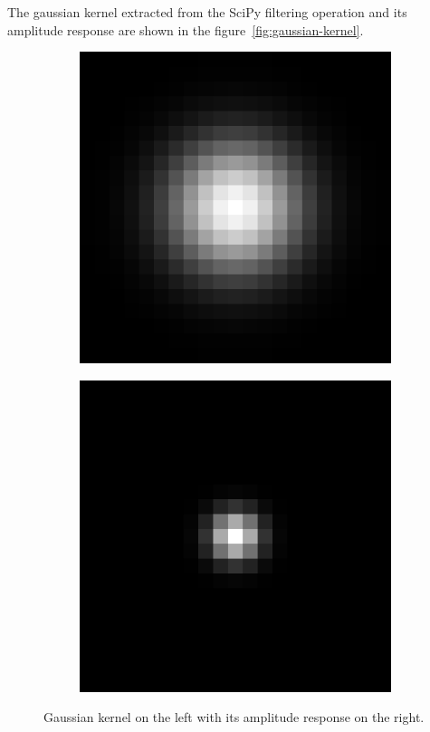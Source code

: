 \documentclass[]{article}
\begin{document}
The gaussian kernel extracted from the SciPy filtering operation and its
amplitude response are shown in the figure~\ref{fig:gaussian-kernel}.
\begin{figure}
  \label{fig:gaussian-kernel}
  \centering
    \begin{subfigure}[t]{0.49\textwidth}
      \centering
      \includegraphics[width=0.99\linewidth]{kernel.png}
    \end{subfigure}
    \begin{subfigure}[t]{0.49\textwidth}
      \centering
      \includegraphics[width=0.99\linewidth]{freq.png}
    \end{subfigure}
    \caption{Gaussian kernel on the left with its amplitude response on the
    right.}
\end{figure}
\end{document}

